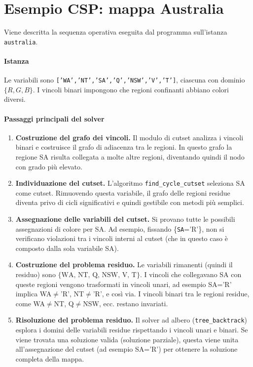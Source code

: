 \documentclass[a4paper,11pt]{article}
\begin{document}
\section{Esempio CSP: mappa Australia}
Viene descritta la sequenza operativa eseguita dal programma sull’istanza \texttt{australia}.  

\paragraph{Istanza}  
Le variabili sono \texttt{['WA','NT','SA','Q','NSW','V','T']}, ciascuna con dominio \(\{R,G,B\}\).  
I vincoli binari impongono che regioni confinanti abbiano colori diversi.  

\paragraph{Passaggi principali del solver}
\begin{enumerate}
  \item \textbf{Costruzione del grafo dei vincoli.}  
  Il modulo di cutset analizza i vincoli binari e costruisce il grafo di adiacenza tra le regioni.  
  In questo grafo la regione SA risulta collegata a molte altre regioni, diventando quindi il nodo con grado più elevato.  

  \item \textbf{Individuazione del cutset.}  
  L’algoritmo \texttt{find\_cycle\_cutset} seleziona SA come cutset.  
  Rimuovendo questa variabile, il grafo delle regioni residue diventa privo di cicli significativi e quindi gestibile con metodi più semplici.  

  \item \textbf{Assegnazione delle variabili del cutset.}  
  Si provano tutte le possibili assegnazioni di colore per SA.  
  Ad esempio, fissando \{\texttt{SA}='R'\}, non si verificano violazioni tra i vincoli interni al cutset (che in questo caso è composto dalla sola variabile SA).  

  \item \textbf{Costruzione del problema residuo.}  
  Le variabili rimanenti (quindi il residuo) sono \(\{\text{WA, NT, Q, NSW, V, T}\}\).  
  I vincoli che collegavano SA con queste regioni vengono trasformati in vincoli unari, ad esempio SA='R' implica WA$\neq$'R', NT$\neq$'R', e così via.  
  I vincoli binari tra le regioni residue, come WA$\neq$NT, Q$\neq$NSW, ecc. restano invariati.  

  \item \textbf{Risoluzione del problema residuo.}  
  Il solver ad albero (\texttt{tree\_backtrack}) esplora i domini delle variabili residue rispettando i vincoli unari e binari.  
  Se viene trovata una soluzione valida (soluzione parziale), questa viene unita all’assegnazione del cutset (ad esempio SA='R') per ottenere la soluzione completa della mappa.  
\end{enumerate}
\end{document}
